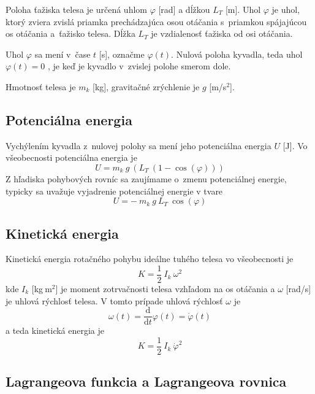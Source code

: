 \documentclass[a4paper, 10pt, ]{article}
\begin{document}
Poloha ťažiska telesa je určená uhlom $\varphi$ [rad] a dĺžkou $L_T$ [m]. Uhol $\varphi$ je uhol,  ktorý zviera zvislá priamka prechádzajúca osou otáčania s~priamkou spájajúcou os otáčania a~ťažisko telesa. Dĺžka $L_T$ je vzdialenosť ťažiska od osi otáčania. 

Uhol $\varphi$ sa mení v~čase $t$ [s], označme $\varphi(t)$. Nulová poloha kyvadla, teda uhol $\varphi(t) = 0$ , je keď je kyvadlo v~zvislej polohe smerom dole.

Hmotnosť telesa je $m_k$ [kg], gravitačné zrýchlenie je $g$ [m/s$^2$]. 



\subsection{Potenciálna energia}

Vychýlením kyvadla z~nulovej polohy sa mení jeho potenciálna energia $U$ [J]. Vo všeobecnosti potenciálna energia je 
\begin{equation}
    U =  m_k \  g \  \left( L_T \ (1 -\cos(\varphi)) \right) 
\end{equation}
Z hľadiska pohybových rovníc sa zaujímame o~zmenu potenciálnej energie, typicky sa uvažuje vyjadrenie potenciálnej energie v tvare
\begin{equation}
    U = - \  m_k \  g \   L_T \  \cos(\varphi) 
\end{equation}




\subsection{Kinetická energia}

Kinetická energia rotačného pohybu ideálne tuhého telesa vo všeobecnosti je 
\begin{equation}
    K = \frac{1}{2} \  I_k \  \omega^2
\end{equation}
kde $I_k$ [kg$\ $m$^2$] je moment zotrvačnosti telesa vzhľadom na os otáčania a $\omega$ [rad/s] je uhlová rýchlosť telesa. V tomto prípade uhlová rýchlosť $\omega$ je 
\begin{equation}
    \omega(t) = \frac{\text{d}}{\text{d}t} \varphi(t) =   \dot\varphi(t)
\end{equation}
a teda kinetická energia je
\begin{equation}
    K = \frac{1}{2} \  I_k \  \dot\varphi^2
\end{equation}


\subsection{Lagrangeova funkcia a Lagrangeova rovnica}
\end{document}
